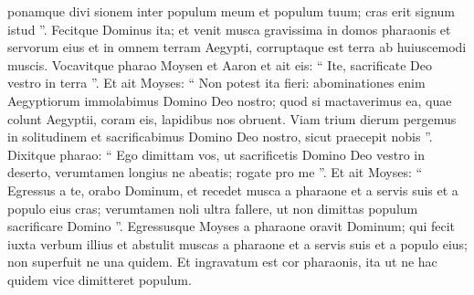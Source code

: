 \begin{biblechapter}
\begin{biblechapter}
\begin{biblechapter}
\begin{biblechapter}
\begin{biblechapter}
\begin{biblechapter}
\begin{biblechapter}
\begin{biblechapter}
\verse ponamque divi sionem inter populum meum et populum tuum; cras erit signum istud ”. 
\verse Fecitque Dominus ita; et venit musca gravissima in domos pharaonis et servorum eius et in omnem terram Aegypti, corruptaque est terra ab huiuscemodi muscis.
 \verse Vocavitque pharao Moysen et Aaron et ait eis: “ Ite, sacrificate Deo vestro in terra ”. 
\verse Et ait Moyses: “ Non potest ita fieri: abominationes enim Aegyptiorum immolabimus Domino Deo nostro; quod si mactaverimus ea, quae colunt Aegyptii, coram eis, lapidibus nos obruent. 
\verse Viam trium dierum pergemus in solitudinem et sacrificabimus Domino Deo nostro, sicut praecepit nobis ”. 
\verse Dixitque pharao: “ Ego dimittam vos, ut sacrificetis Domino Deo vestro in deserto, verumtamen longius ne abeatis; rogate pro me ”. 
\verse Et ait Moyses: “ Egressus a te, orabo Dominum, et recedet musca a pharaone et a servis suis et a populo eius cras; verumtamen noli ultra fallere, ut non dimittas populum sacrificare Domino ”. 
\verse Egressusque Moyses a pharaone oravit Dominum; 
 \verse qui fecit iuxta verbum illius et abstulit muscas a pharaone et a servis suis et a populo eius; non superfuit ne una quidem. 
\verse Et ingravatum est cor pharaonis, ita ut ne hac quidem vice dimitteret populum.
 

\end{biblechapter}
\end{biblechapter}
\end{biblechapter}
\end{biblechapter}
\end{biblechapter}
\end{biblechapter}
\end{biblechapter}
\end{biblechapter}
